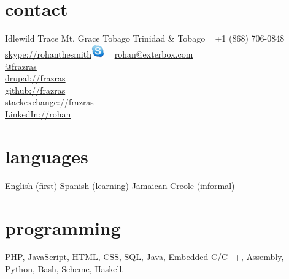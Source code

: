 \documentclass[]{friggeri-cv} %
\begin{document}


\begin{aside} %
\section{contact}
Idlewild Trace
Mt. Grace
Tobago
Trinidad \& Tobago
~
+1 (868) 706-0848
\href {skype://rohanthesmith}{skype://rohanthesmith}\includegraphics[height=16pt]{images/skype.png}
~
\href{mailto:rohan@exterbox.com}{rohan@exterbox.com}\\%
\href{http://twitter.com/frazras}{@frazras}\\%
\href{http://drupal.org/user/34622}{drupal://frazras}\\%
\href {https://github.com/frazras}{github://frazras}\\%
\href{http://stackexchange.com/users/530574/frazras?tab=accounts}{stackexchange://frazras}\\%
\href {http://jm.linkedin.com/in/rohansmith}{LinkedIn://rohan}\\%
\section{languages}
English (first)
Spanish (learning)
Jamaican Creole (informal)
\section{programming}
 PHP,  JavaScript, HTML, CSS, SQL, Java, Embedded C/C++, Assembly, Python, Bash, Scheme, Haskell.
\end{aside}
\end{document}
